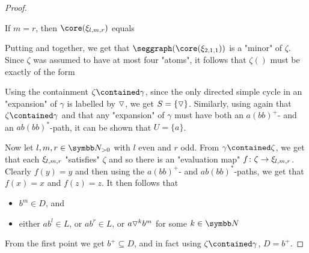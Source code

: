 \begin{proof}
	\begin{claim}
		\AP\label{claim:example-union-matter-2}
		If $m=r$, then $\core(\anexpansion_{l,m,r})$ equals
		\begin{center}
			\small
		\end{center}
	\end{claim}
	Putting  and
	 together, we get that 
	$\seggraph(\core(\anexpansion_{2,1,1}))$ is a "minor" of $\zeta$.
	Since $\zeta$ was assumed to have at most four "atoms",
	it follows that $\zeta()$ must be exactly of the form
	\begin{center}
	\end{center}
	Using the containment $\zeta \contained \gamma$,
	since the only directed simple cycle in an "expansion" of $\gamma$ is labelled
	by $\triangledown$, we get $S = \{\triangledown\}$.
	Similarly, using again that $\zeta \contained \gamma$ and that any "expansion" of $\gamma$
	must have both an $a(bb)^+$- and an $ab(bb)^*$-path, it can be shown that $U = \{a\}$.

	Now let $l,m,r \in \Np$ with $l$ even and $r$ odd.
	From $\gamma \contained \zeta$, we get that each $\xi_{l,m,r}$ "satisfies"
	$\zeta$ and so there is an "evaluation map" $f\colon \zeta \to \xi_{l,m,r}$.
	Clearly $f(y) = y$ and then using the
	$a(bb)^+$- and $ab(bb)^*$-paths, we get that $f(x) = x$ and $f(z) = z$. 
	It then follows that
	\begin{itemize}
		\item $b^m \in D$, and
		\item either $ab^l \in L$, or $ab^r \in L$, or $a \triangledown^k b^m$ for some $k\in\N$
	\end{itemize}
	From the first point we get $b^+ \subseteq D$, and in fact using $\zeta\contained \gamma$,
	$D = b^+$.


\end{proof}
